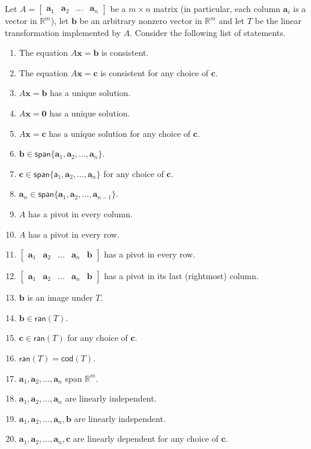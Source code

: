 \documentclass{article}
\newcommand{\vv}[1]{\mathbf{#1}}
\newcommand{\vspan}{\mathsf{span}}
\newcommand{\ran}{\mathsf{ran}}
\newcommand{\cod}{\mathsf{cod}}
\newcommand{\R}{\mathbb R}
\theoremstyle{remark}
\begin{document}
Let
$
A =
\begin{bmatrix}
  \mathbf a_1 & \mathbf a_2 & \dots & \mathbf a_n
\end{bmatrix}
$
be a $m \times n$ matrix (in particular, each column $\mathbf a_i$ is a vector in $\mathbb R^m$), let $\mathbf b$ be an arbitrary nonzero vector in $\mathbb R^m$ and let $T$ be the linear transformation implemented by $A$.
Consider the following list of statements.
\begin{enumerate}[label=\arabic*.]
\item The equation $A \mathbf x = \mathbf b$ is consistent.
\item The equation $A \mathbf x = \mathbf c$ is consistent for any choice of $\mathbf c$.
\item $A \mathbf x = \mathbf b$ has a unique solution.
\item $A \mathbf x = \mathbf 0$ has a unique solution.
\item $A \mathbf x = \mathbf c$ has a unique solution for any choice of $\mathbf c$.
\item $\mathbf b \in \vspan\{\mathbf a_1, \mathbf a_2, \dots, \mathbf a_n\}$.
\item $\mathbf c \in \vspan\{\mathsf a_1, \mathbf a_2, \dots, \mathbf a_n\}$ for any choice of $\mathbf c$.
\item $\vv a_n \in \vspan\{\vv a_1, \vv a_2, \dots, \vv a_{n - 1}\}$.
\item $A$ has a pivot in every column.
\item $A$ has a pivot in every row.
\item $\begin{bmatrix} \vv a_1 & \vv a_2 & \dots & \vv a_n & \vv b \end{bmatrix}$ has a pivot in every row.
\item $\begin{bmatrix} \vv a_1 & \vv a_2 & \dots & \vv a_n & \vv b \end{bmatrix}$ has a pivot in its last (rightmost) column.
\item $\vv b$ is an image under $T$.
\item $\vv b \in \ran(T)$.
\item $\vv c \in \ran(T)$ for any choice of $\vv c$.
\item $\ran(T) = \cod(T)$.
\item $\vv a_1, \vv a_2, \dots, \vv a_n$ span $\R^m$.
\item $\vv a_1, \vv a_2, \dots, \vv a_n$ are linearly independent.
\item $\vv a_1, \vv a_2, \dots, \vv a_n, \vv b$ are linearly independent.
\item $\vv a_1, \vv a_2, \dots, \vv a_n, \vv c$ are linearly dependent for any choice of $\mathbf c$.
\end{enumerate}
\end{document}
